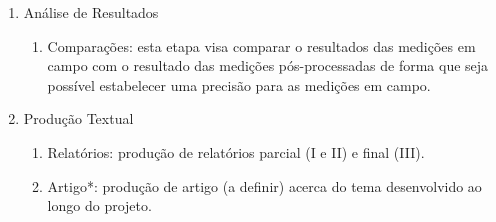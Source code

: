\begin{enumerate}
    \item Análise de Resultados
        \begin{enumerate} 
            \item Comparações: esta etapa visa comparar o resultados das medições em campo com o resultado das medições pós-processadas de forma que seja possível estabelecer uma precisão para as medições em campo.
        \end{enumerate}

    \item Produção Textual
        \begin{enumerate} 
            \item Relatórios: produção de relatórios parcial (I e II) e final (III).
            \item Artigo*: produção de artigo (a definir) acerca do tema desenvolvido ao longo do projeto.
        \end{enumerate}
\end{enumerate}